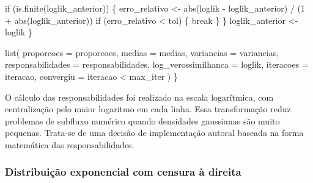 \documentclass[
  letterpaper,
  DIV=11,
  numbers=noendperiod]{scrreprt}
\newenvironment{Shaded}{\begin{snugshade}}{\end{snugshade}}
\newcommand{\AttributeTok}[1]{\textcolor[rgb]{0.40,0.45,0.13}{#1}}
\newcommand{\ControlFlowTok}[1]{\textcolor[rgb]{0.00,0.23,0.31}{#1}}
\newcommand{\DecValTok}[1]{\textcolor[rgb]{0.68,0.00,0.00}{#1}}
\newcommand{\FunctionTok}[1]{\textcolor[rgb]{0.28,0.35,0.67}{#1}}
\newcommand{\NormalTok}[1]{\textcolor[rgb]{0.00,0.23,0.31}{#1}}
\newcommand{\OtherTok}[1]{\textcolor[rgb]{0.00,0.23,0.31}{#1}}
\newcommand{\SpecialCharTok}[1]{\textcolor[rgb]{0.37,0.37,0.37}{#1}}
\begin{document}
\begin{Shaded}
\begin{Highlighting}[]
    \ControlFlowTok{if}\NormalTok{ (}\FunctionTok{is.finite}\NormalTok{(loglik\_anterior)) \{}
\NormalTok{      erro\_relativo }\OtherTok{\textless{}{-}} \FunctionTok{abs}\NormalTok{(loglik }\SpecialCharTok{{-}}\NormalTok{ loglik\_anterior) }\SpecialCharTok{/}
\NormalTok{        (}\DecValTok{1} \SpecialCharTok{+} \FunctionTok{abs}\NormalTok{(loglik\_anterior))}
      \ControlFlowTok{if}\NormalTok{ (erro\_relativo }\SpecialCharTok{\textless{}}\NormalTok{ tol) \{}
        \ControlFlowTok{break}
\NormalTok{      \}}
\NormalTok{    \}}
\NormalTok{    loglik\_anterior }\OtherTok{\textless{}{-}}\NormalTok{ loglik}
\NormalTok{  \}}

  \FunctionTok{list}\NormalTok{(}
    \AttributeTok{proporcoes =}\NormalTok{ proporcoes,}
    \AttributeTok{medias =}\NormalTok{ medias,}
    \AttributeTok{variancias =}\NormalTok{ variancias,}
    \AttributeTok{responsabilidades =}\NormalTok{ responsabilidades,}
    \AttributeTok{log\_verossimilhanca =}\NormalTok{ loglik,}
    \AttributeTok{iteracoes =}\NormalTok{ iteracao,}
    \AttributeTok{convergiu =}\NormalTok{ iteracao }\SpecialCharTok{\textless{}}\NormalTok{ max\_iter}
\NormalTok{  )}
\NormalTok{\}}
\end{Highlighting}
\end{Shaded}

\begin{tcolorbox}[enhanced jigsaw, colback=white, leftrule=.75mm, colbacktitle=quarto-callout-note-color!10!white, breakable, titlerule=0mm, bottomtitle=1mm, title=\textcolor{quarto-callout-note-color}{\faInfo}\hspace{0.5em}{Observação computacional}, colframe=quarto-callout-note-color-frame, toprule=.15mm, opacityback=0, bottomrule=.15mm, opacitybacktitle=0.6, arc=.35mm, toptitle=1mm, rightrule=.15mm, coltitle=black, left=2mm]

O cálculo das responsabilidades foi realizado na escala logarítmica, com
centralização pelo maior logaritmo em cada linha. Essa transformação
reduz problemas de subfluxo numérico quando densidades gaussianas são
muito pequenas. Trata-se de uma decisão de implementação autoral baseada
na forma matemática das responsabilidades.

\end{tcolorbox}

\subsubsection{Distribuição exponencial com censura à
direita}\label{distribuiuxe7uxe3o-exponencial-com-censura-uxe0-direita}
\end{document}
